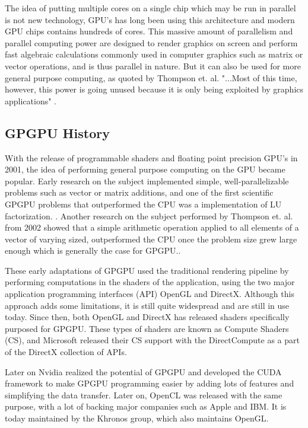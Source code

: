 The idea of putting multiple cores on a single chip which may be run in parallel is not new technology, GPU's has long been using this architecture and modern GPU chips contains hundreds of cores. This massive amount of parallelism and parallel computing power are designed to render graphics on screen and perform fast algebraic calculations commonly used in computer graphics such as matrix or vector operations, and is thus parallel in nature. But it can also be used for more general purpose computing, as quoted by Thompson et. al. "...Most of this time, however, this power is going unused because it is only
being exploited by graphics applications" \cite{thompson2002gpgpu}.


\subsection{GPGPU History}
With the release of programmable shaders and floating point precision GPU's in 2001, the idea of performing general purpose computing on the GPU became popular. Early research on the subject implemented simple, well-parallelizable problems such as vector or matrix additions, and one of the first scientific GPGPU problems that outperformed the CPU was a implementation of LU factorization. \cite{CUDAtoOpenCL}. Another research on the subject performed by Thompson et. al. from 2002 showed that a simple arithmetic operation applied to all elements of a vector of varying sized, outperformed the CPU once the problem size grew large enough which is generally the case for GPGPU.\cite{thompson2002gpgpu}.

These early adaptations of GPGPU used the traditional rendering pipeline by performing computations in the shaders of the application, using the two major application programming interfaces (API) OpenGL and DirectX. Although this approach adds some limitations, it is still quite widespread and are still in use today. Since then, both OpenGL and DirectX has released shaders specifically purposed for GPGPU. These types of shaders are known as Compute Shaders (CS), and Microsoft released their CS support with the DirectCompute as a part of the DirectX collection of APIs.

Later on Nvidia realized the potential of GPGPU and developed the CUDA framework to make GPGPU programming easier by adding lots of features and simplifying the data transfer. Later on, OpenCL was released with the same purpose, with a lot of backing major companies such as Apple and IBM. It is today maintained by the Khronos group, which also maintains OpenGL.

